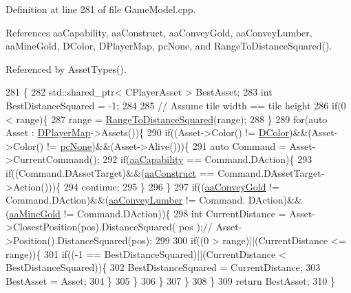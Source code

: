 Definition at line 281 of file Game\+Model.\+cpp.



References aa\+Capability, aa\+Construct, aa\+Convey\+Gold, aa\+Convey\+Lumber, aa\+Mine\+Gold, D\+Color, D\+Player\+Map, pc\+None, and Range\+To\+Distance\+Squared().



Referenced by Asset\+Types().


\begin{DoxyCode}
281                                                                                         \{
282     std::shared\_ptr< CPlayerAsset > BestAsset;
283     \textcolor{keywordtype}{int} BestDistanceSquared = -1;
284     
285     \textcolor{comment}{// Assume tile width == tile height}
286     \textcolor{keywordflow}{if}(0 < range)\{
287         range = \hyperlink{GameModel_8cpp_afd5c111a1369dc53d1b1230506e99f7c}{RangeToDistanceSquared}(range);
288     \}
289     \textcolor{keywordflow}{for}(\textcolor{keyword}{auto} Asset : \hyperlink{classCPlayerData_a452163191cd4603e1e38dd8d4bb9691c}{DPlayerMap}->Assets())\{
290         \textcolor{keywordflow}{if}((Asset->Color() != \hyperlink{classCPlayerData_a65d69aaa09c8fc0f7ddfa5e858313085}{DColor})&&(Asset->Color() != \hyperlink{GameDataTypes_8h_aafb0ca75933357ff28a6d7efbdd7602fa88767aa8e02c7b3192bbab4127b3d729}{pcNone})&&(Asset->Alive()))\{
291             \textcolor{keyword}{auto} Command = Asset->CurrentCommand();
292             \textcolor{keywordflow}{if}(\hyperlink{GameDataTypes_8h_ab47668e651a3032cfb9c40ea2d60d670acf9fb164e8abd71c71f4a8c7fda360d4}{aaCapability} == Command.DAction)\{
293                 \textcolor{keywordflow}{if}((Command.DAssetTarget)&&(\hyperlink{GameDataTypes_8h_ab47668e651a3032cfb9c40ea2d60d670a7ef6b863f66dd7dcc95a199cd758ae1d}{aaConstruct} == Command.DAssetTarget->Action()))\{
294                     \textcolor{keywordflow}{continue};   
295                 \}
296             \}
297             \textcolor{keywordflow}{if}((\hyperlink{GameDataTypes_8h_ab47668e651a3032cfb9c40ea2d60d670ae80ac4dde60023e0a1794e994db7000a}{aaConveyGold} != Command.DAction)&&(\hyperlink{GameDataTypes_8h_ab47668e651a3032cfb9c40ea2d60d670a7b0954302f27f46b3fdf6fddd530d154}{aaConveyLumber} != Command.
      DAction)&&(\hyperlink{GameDataTypes_8h_ab47668e651a3032cfb9c40ea2d60d670abc45b1c4fbca1481e373a780a69bd56b}{aaMineGold} != Command.DAction))\{
298                 \textcolor{keywordtype}{int} CurrentDistance = Asset->ClosestPosition(pos).DistanceSquared( pos );\textcolor{comment}{//
      Asset->Position().DistanceSquared(pos);}
299                 
300                 \textcolor{keywordflow}{if}((0 > range)||(CurrentDistance <= range))\{
301                     \textcolor{keywordflow}{if}((-1 == BestDistanceSquared)||(CurrentDistance < BestDistanceSquared))\{
302                         BestDistanceSquared = CurrentDistance;
303                         BestAsset = Asset;
304                     \}
305                 \}
306             \}
307         \}
308     \}
309     \textcolor{keywordflow}{return} BestAsset;
310 \}
\end{DoxyCode}

